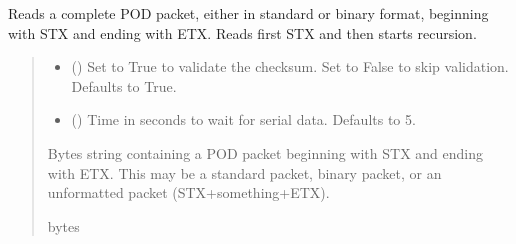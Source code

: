 \documentclass[letterpaper,10pt,english]{sphinxmanual}
\begin{document}
\begin{fulllineitems}
\begin{fulllineitems}
\label{\detokenize{BasicPodProtocol:BasicPodProtocol.POD_Basics.ReadPODpacket}}
\pysigstartsignatures
{}
\pysigstopsignatures
\sphinxAtStartPar
Reads a complete POD packet, either in standard or binary format, beginning with STX and         ending with ETX. Reads first STX and then starts recursion.
\begin{quote}\begin{description}
\begin{itemize}
\item {} 
\sphinxAtStartPar
{} (\sphinxstyleliteralemphasis{\sphinxupquote{, }}) \textendash{} Set to True to validate the checksum. Set to False to                 skip validation. Defaults to True.

\item {} 
\sphinxAtStartPar
{} (\sphinxstyleliteralemphasis{\sphinxupquote{|}}\sphinxstyleliteralemphasis{\sphinxupquote{, }}) \textendash{} Time in seconds to wait for serial data.                 Defaults to 5.

\end{itemize}

\sphinxAtStartPar
Bytes string containing a POD packet beginning with STX and ending with ETX. This                 may be a standard packet, binary packet, or an unformatted packet (STX+something+ETX).

\sphinxAtStartPar
bytes

\end{description}\end{quote}

\end{fulllineitems}


\end{fulllineitems}
\end{document}
